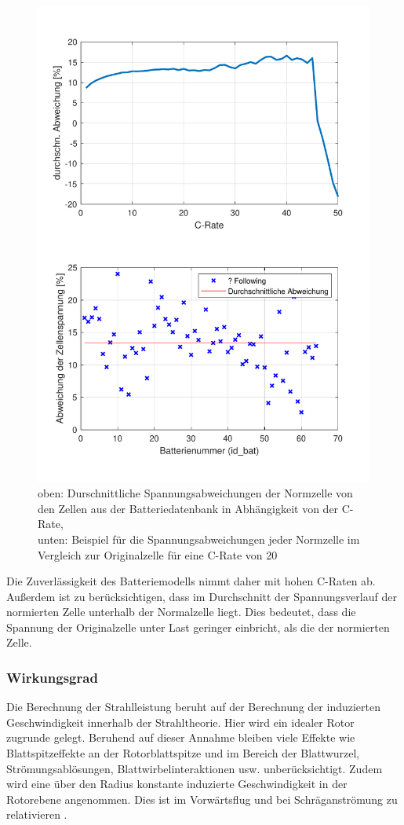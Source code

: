 \begin{figure}[H]
\centering
	\includegraphics{Diagramme/Abweichungen.pdf}
	\caption{oben: Durschnittliche Spannungsabweichungen der Normzelle von den Zellen aus der Batteriedatenbank in Abhängigkeit von der C-Rate, \\
	unten: Beispiel für die Spannungsabweichungen jeder Normzelle im Vergleich zur Originalzelle für eine C-Rate von 20}
	\label{abb:abweichungen}
\end{figure}
Die Zuverlässigkeit des Batteriemodells nimmt daher mit hohen C-Raten ab. Außerdem ist zu berücksichtigen, dass im Durchschnitt der Spannungsverlauf der normierten Zelle unterhalb der Normalzelle liegt. Dies bedeutet, dass die Spannung der Originalzelle unter Last geringer einbricht, als die der normierten Zelle.  

\subsubsection{Wirkungsgrad}
Die Berechnung der Strahlleistung beruht auf der Berechnung der induzierten Geschwindigkeit innerhalb der Strahltheorie. Hier wird ein idealer Rotor zugrunde gelegt.
Beruhend auf dieser Annahme bleiben viele Effekte wie Blattspitzeffekte an der Rotorblattspitze und im Bereich der Blattwurzel, Strömungsablösungen, Blattwirbelinteraktionen usw. unberücksichtigt.  Zudem wird eine über den Radius konstante induzierte Geschwindigkeit in der Rotorebene angenommen. Dies ist im Vorwärtsflug und bei Schräganströmung zu relativieren \cite[S.226]{Wall.2015}.

